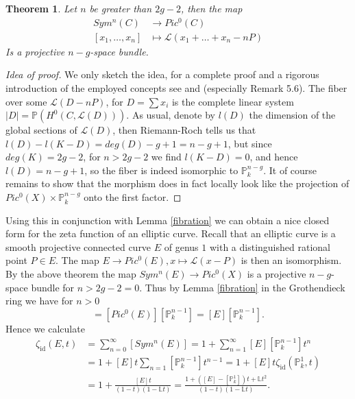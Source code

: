 \documentclass[11pt, a4paper, german, twoside]{article}
\theoremstyle{plain}
\newtheorem{theorem}{Theorem}[section]
\theoremstyle{definition}
\begin{document}
\begin{theorem}%
    Let $n$ be greater than $2g-2$, then the map  
    \begin{align*}
        Sym^n(C) &\to Pic^0(C) \\
        [x_1,\dots,x_n] &\mapsto \mathcal{L}(x_1 + \dots + x_n - nP)
    \end{align*}
    Is a projective $n-g$-space bundle.
\end{theorem}
\begin{proof}[Idea of proof]
    We only sketch the idea, for a complete proof and a rigorous introduction of the employed concepts see \cite{schwarzenberger1963}
    and \cite[Chap. III.5]{milneAV} (especially Remark 5.6).
    The fiber over some $\mathcal{L}(D - nP)$, for $D = \sum x_i$ is the complete linear system $|D| = \mathbb{P}(H^0(C, \mathcal{L}(D)))$.
    As usual, denote by $l(D)$ the dimension of the global sections of $\mathcal{L}(D)$, then Riemann-Roch tells us 
    that $l(D) - l(K-D) = deg(D) - g + 1 = n - g + 1$, but since $deg(K) = 2g-2$, for $n > 2g-2$ we find $l(K-D) = 0$, and hence
    $l(D) = n-g+1$, so the fiber is indeed isomorphic to $\mathbb{P}_k^{n-g}$. It of course remains to show that the morphism does in
    fact locally look like the projection of $Pic^0(X) \times \mathbb{P}_k^{n-g}$ onto the first factor.
\end{proof}

Using this in conjunction with Lemma \ref{fibration} we can obtain a nice closed form for the zeta function of an elliptic curve.
Recall that an elliptic curve is a smooth projective connected curve $E$ of genus $1$ with a distinguished rational point $P \in E$. The
map $E \to Pic^0(E), x \mapsto \mathcal{L}(x-P)$ is then an isomorphism. By the above theorem the map $Sym^n(E) \to Pic^0(X)$ is a projective $n-g$-space
bundle for
$n > 2g - 2 = 0$. 
Thus by Lemma \ref{fibration} in the Grothendieck ring we have for $n>0$ 
\begin{equation}
    [Sym^n(E)] = [Pic^0(E)][\mathbb{P}_k^{n-1}] = [E][\mathbb{P}_k^{n-1}].
\end{equation}
Hence we calculate
\begin{align*}
    \zeta_{\mathrm{id}}(E,t) &= \sum_{n=0}^{\infty} [Sym^n(E)] = 1 + \sum_{n=1}^\infty [E][\mathbb{P}_k^{n-1}]t^n \\
                             &= 1 + [E]t \sum_{n=1}[\mathbb{P}_k^{n-1}]t^{n-1} = 1 + [E]t \zeta_{\mathrm{id}}(\mathbb{P}_k^1, t)\\
                             &= 1 + \frac{[E]t}{(1-t)(1-\mathbb{L}t)} = \frac{1 + ([E]-[\mathbb{P}_k^1])t + \mathbb{L}t^2}{(1-t)(1-\mathbb{L}t)}.
\end{align*}
\end{document}
